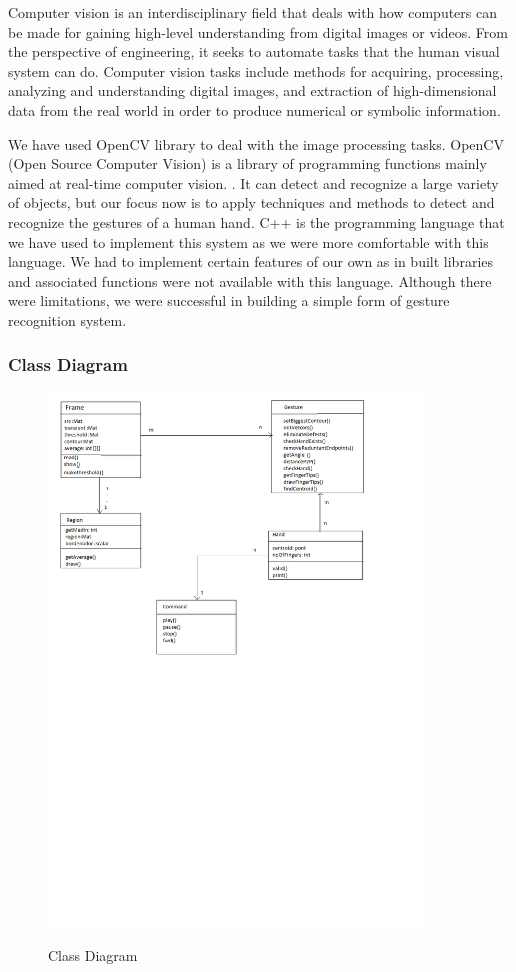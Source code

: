 \documentclass[a4paper,11pt]{article}
\begin{document}
			 	 Computer vision is an interdisciplinary field that deals with how computers can be made for gaining high-level understanding from digital images or videos. From the perspective of engineering, it seeks to automate tasks that the human visual system can do. Computer vision tasks include methods for acquiring, processing, analyzing and understanding digital images, and extraction of high-dimensional data from the real world in order to produce numerical or symbolic information.

			 	 We have used OpenCV library to deal with the image processing tasks. OpenCV (Open Source Computer Vision) is a library of programming functions mainly aimed at real-time computer vision.
			 	 . It can detect and recognize a large variety of objects, but our focus now is to apply techniques and methods to detect and recognize the gestures of a human hand. C++ is the programming language that we have used to implement this system as we were more comfortable with this language. We had to implement certain features of our own as in built libraries and associated functions were not available with this language. Although there were limitations, we were successful in building a simple form of gesture recognition system. \\
			\subsubsection{Class Diagram}
			\begin{figure}[!ht]
			\begin{centering}
				\includegraphics[width=10cm]{images/class.png}\\
						\caption{Class Diagram}
			\end{centering}
		\end{figure}
		\newpage
\end{document}
